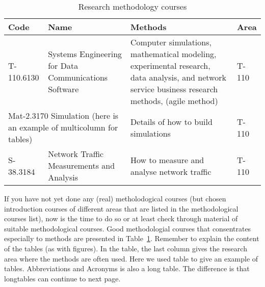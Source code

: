 \begin{table}
\begin{tabular}{|p{2cm}|p{3.8cm}|p{4.5cm}|p{1.1cm}|} 
\hline %
\textbf{Code} & \textbf{Name} & \textbf{Methods} & \textbf{Area} \\ 
\hline 
T-110.6130 & Systems Engineering for Data Communications
    Software & \raggedright Computer simulations, mathematical modeling,
  experimental research, data analysis, and network service business
  research methods, (agile method) & T-110 \\ 
\hline
\multicolumn{2}{|p{6.25cm}|}{Mat-2.3170 Simulation (here is an example of
 multicolumn for tables)}& Details of how to build simulations & T-110 \\
\hline
S-38.3184 & Network Traffic Measurements and Analysis 
& \raggedright How to measure and analyse network
  traffic & T-110 \\ \hline
\end{tabular} %
\caption{Research methodology courses}
\label{table:courses}
\end{table} %

If you have not yet done any (real) metholodogical courses (but chosen
introduction courses of different areas that are listed in the
methodological courses list), now is the time to do so or at least
check through material of suitable methodological courses. Good
methodologial courses that consentrates especially to methods are
presented in Table~\ref{table:courses}. Remember to explain the
content of the tables (as with figures). In the table, the last column
gives the research area where the methods are often used. Here we used
table to give an example of tables. Abbreviations and Acronyms is also
a long table. The difference is that longtables can continue to next
page.

